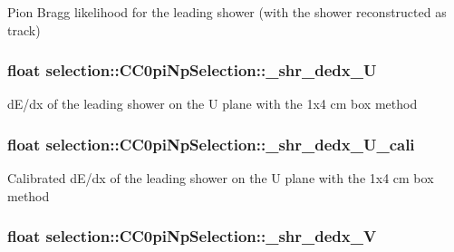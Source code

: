 Pion Bragg likelihood for the leading shower (with the shower reconstructed as track) \hypertarget{classselection_1_1CC0piNpSelection_ada2f72c2f814e7d06c24a50ff5ad4fcc}{
\subsubsection[{\-\_\-shr\-\_\-dedx\-\_\-\-U}]{\setlength{\rightskip}{0pt plus 5cm}float selection\-::\-C\-C0pi\-Np\-Selection\-::\-\_\-shr\-\_\-dedx\-\_\-\-U\hspace{0.3cm}{\ttfamily [private]}}}\label{classselection_1_1CC0piNpSelection_ada2f72c2f814e7d06c24a50ff5ad4fcc}
d\-E/dx of the leading shower on the U plane with the 1x4 cm box method \hypertarget{classselection_1_1CC0piNpSelection_a7c90820db5398c179aef3186ab11e521}{
\subsubsection[{\-\_\-shr\-\_\-dedx\-\_\-\-U\-\_\-cali}]{\setlength{\rightskip}{0pt plus 5cm}float selection\-::\-C\-C0pi\-Np\-Selection\-::\-\_\-shr\-\_\-dedx\-\_\-\-U\-\_\-cali\hspace{0.3cm}{\ttfamily [private]}}}\label{classselection_1_1CC0piNpSelection_a7c90820db5398c179aef3186ab11e521}
Calibrated d\-E/dx of the leading shower on the U plane with the 1x4 cm box method \hypertarget{classselection_1_1CC0piNpSelection_a392211f6d023d92bf113c20098c5e7fe}{
\subsubsection[{\-\_\-shr\-\_\-dedx\-\_\-\-V}]{\setlength{\rightskip}{0pt plus 5cm}float selection\-::\-C\-C0pi\-Np\-Selection\-::\-\_\-shr\-\_\-dedx\-\_\-\-V\hspace{0.3cm}{\ttfamily [private]}}}\label{classselection_1_1CC0piNpSelection_a392211f6d023d92bf113c20098c5e7fe}

